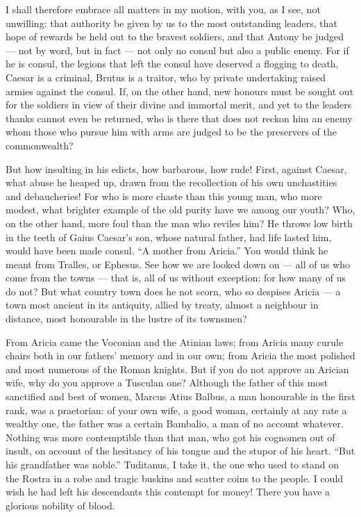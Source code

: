 I shall therefore embrace all matters in my motion, with you, as I see, not unwilling: that authority be given by us to the most outstanding leaders, that hope of rewards be held out to the bravest soldiers, and that Antony be judged --- not by word, but in fact --- not only no consul but also a public enemy. For if he is consul, the legions that left the consul have deserved a flogging to death, Caesar is a criminal, Brutus is a traitor, who by private undertaking raised armies against the consul. If, on the other hand, new honours must be sought out for the soldiers in view of their divine and immortal merit, and yet to the leaders thanks cannot even be returned, who is there that does not reckon him an enemy whom those who pursue him with arms are judged to be the preservers of the commonwealth?

 But how insulting in his edicts, how barbarous, how rude! First, against Caesar, what abuse he heaped up, drawn from the recollection of his own unchastities and debaucheries! For who is more chaste than this young man, who more modest, what brighter example of the old purity have we among our youth? Who, on the other hand, more foul than the man who reviles him? He throws low birth in the teeth of Gaius Caesar's son, whose natural father, had life lasted him, would have been made consul. ``A mother from Aricia.'' You would think he meant from Tralles, or Ephesus. See how we are looked down on --- all of us who come from the towns --- that is, all of us without exception: for how many of us do not? But what country town does he not scorn, who so despises Aricia --- a town most ancient in its antiquity, allied by treaty, almost a neighbour in distance, most honourable in the lustre of its townsmen?

 From Aricia came the Voconian and the Atinian laws; from Aricia many curule chairs both in our fathers' memory and in our own; from Aricia the most polished and most numerous of the Roman knights. But if you do not approve an Arician wife, why do you approve a Tusculan one? Although the father of this most sanctified and best of women, Marcus Atius Balbus, a man honourable in the first rank, was a praetorian: of your own wife, a good woman, certainly at any rate a wealthy one, the father was a certain Bambalio, a man of no account whatever. Nothing was more contemptible than that man, who got his cognomen out of insult, on account of the hesitancy of his tongue and the stupor of his heart. ``But his grandfather was noble.'' Tuditanus, I take it, the one who used to stand on the Rostra in a robe and tragic buskins and scatter coins to the people. I could wish he had left his descendants this contempt for money! There you have a glorious nobility of blood.

